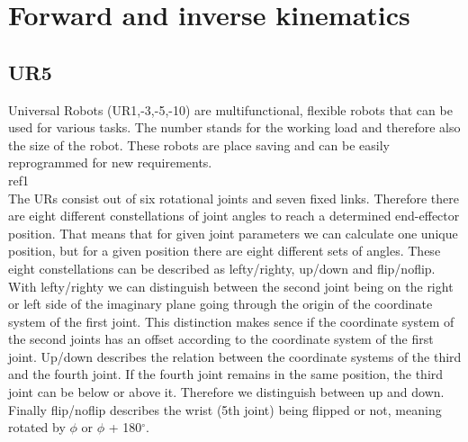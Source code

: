 \chapter{Forward and inverse kinematics}

\section{UR5}
Universal Robots (UR1,-3,-5,-10) are multifunctional, flexible robots that can be used for various tasks. 
The number stands for the working load and therefore also the size of the robot. These robots 
are place saving and can be easily reprogrammed for new requirements. \\

ref1 \\

The URs consist out of six rotational joints and seven fixed links. Therefore there are eight different
constellations of joint angles to reach a determined end-effector position. That means that for given joint parameters we can calculate one unique position, but for a given position there are eight different sets of angles. These eight constellations can be described as lefty/righty, up/down and flip/noflip. With lefty/righty we can distinguish between the second joint being on the right or left
side of the imaginary plane going through the origin of the coordinate system of the first joint. This distinction makes sence if the coordinate system of the second joints has an offset according to the coordinate system of the first joint.  Up/down describes the relation between the coordinate systems of the third and the fourth joint. If the fourth joint remains in the same position, the third joint can 
be below or above it. Therefore we distinguish between up and down. Finally flip/noflip describes
the wrist (5th joint) being flipped or not, meaning rotated by $\phi$ or $\phi$ + 180$^\circ$. 

